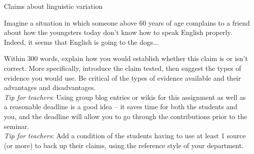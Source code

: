 \begin{exercises}{Claims about linguistic variation}
\chili{}

Imagine a situation in which someone above 60 years of age complains to a friend about how the youngsters today don't know how to speak English properly. Indeed, it seems that English is going to the dogs...
 
Within 300 words, explain how you would establish whether this claim is or isn't correct. More specifically, introduce the claim tested, then suggest the types of evidence you would use. Be critical of the types of evidence available and their advantages and disadvantages.\\
 
\noindent \emph{Tip for teachers}: Using group blog entries or wikis for this assignment as well as a reasonable deadline is a good idea -- it saves time for both the students and you, and the deadline will allow you to go through the contributions prior to the seminar.\\
 
\noindent \emph{Tip for teachers}: Add a condition of the students having to use at least 1 source (or more) to back up their claims, using the reference style of your department.\\
\end{exercises}

